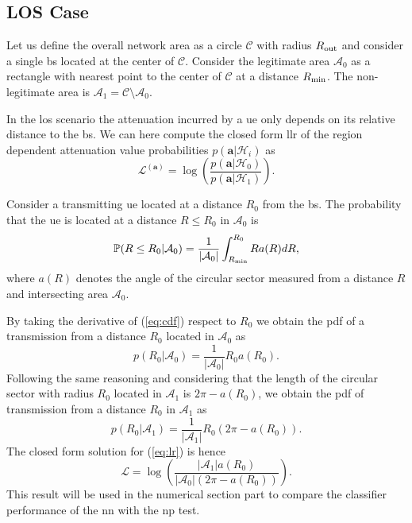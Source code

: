 \documentclass[conference]{IEEEtran}
\begin{document}
\subsection{LOS Case}
Let us define the overall network area as a circle $\mathcal{C}$ with radius $R_{\rm out}$ and consider a single \ac{bs} located at the center of $\mathcal{C}$. Consider the legitimate area $\mathcal{A}_{0}$ as a rectangle with nearest point to the center of $\mathcal{C}$ at a distance $R_{\rm min}$. The non-legitimate area is $\mathcal{A}_1 = \mathcal{C} \setminus \mathcal{A}_0$.

In the \ac{los} scenario the attenuation incurred by a \ac{ue} only depends on its relative distance to the \ac{bs}. We can here compute the closed form \ac{llr} of the region dependent attenuation value probabilities $p(\bm{a}|\mathcal{H}_i)$ as
\begin{equation}\label{eq:lr}
    \mathcal{L}^{(\bm{a})}=\log\left(\frac{p(\bm{a}|\mathcal{H}_0)}{p(\bm{a}|\mathcal{H}_1)}\right).
\end{equation}

Consider a transmitting \ac{ue} located at a distance $R_0$ from the \ac{bs}. The probability that the \ac{ue} is located at a distance $R\le R_0$ in $\mathcal{A}_0$ is
\begin{equation}\label{eq:cdf}
     \mathbb{P}(R \le R_0|\mathcal{A}_0) = \frac{1}{|\mathcal{A}_0|}\int_{R_{\rm min}}^{R_0} R a(R) dR,
\end{equation}
where $a(R)$ denotes the angle of the circular sector measured from a distance $R$ and intersecting area $\mathcal{A}_0$.

By taking the derivative of (\ref{eq:cdf}) respect to $R_0$ we obtain the \ac{pdf} of a transmission from a distance $R_0$ located in $\mathcal{A}_0$ as
\begin{equation}
    p(R_0|\mathcal{A}_0) = \frac{1}{|\mathcal{A}_0|}R_0a(R_0).
\end{equation}
Following the same reasoning and considering that the length of the circular sector with radius $R_0$ located in $\mathcal{A}_1$ is $2\pi - a(R_0)$, we obtain the \ac{pdf} of transmission from a distance $R_0$ in $\mathcal{A}_1$ as
\begin{equation}
     p(R_0|\mathcal{A}_1) = \frac{1}{|\mathcal{A}_1|}R_0\left(2\pi-a(R_0)\right).
\end{equation}
The closed form solution for (\ref{eq:lr}) is hence
\begin{equation}
    \mathcal{L}=\log\left(\frac{|\mathcal{A}_1|a(R_0)}{|\mathcal{A}_0|\left(2\pi-a(R_0)\right)}\right).
\end{equation}
This result will be used in the numerical section part to compare the classifier performance of the \ac{nn} with the \ac{np} test.
\end{document}
